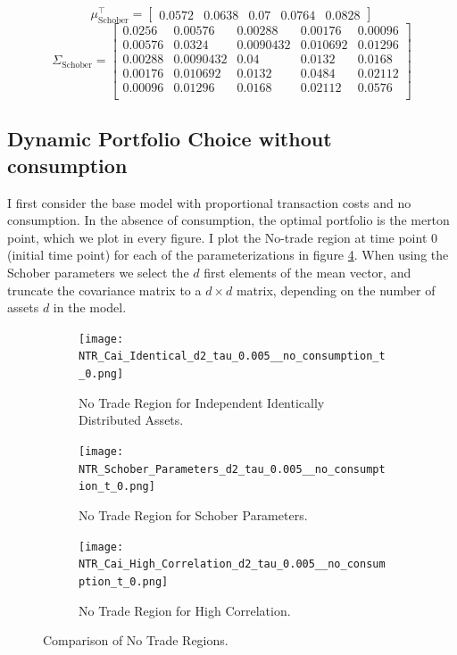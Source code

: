 \documentclass[11pt]{article}
\begin{document}
\[
\mu_{\text{Schober}}^\top = 
\begin{bmatrix}
0.0572 & 0.0638 & 0.07 & 0.0764 & 0.0828
\end{bmatrix}
\]
\[
\Sigma_{\text{Schober}} = 
\begin{bmatrix}
0.0256 & 0.00576 & 0.00288 & 0.00176 & 0.00096 \\
0.00576 & 0.0324 & 0.0090432 & 0.010692 & 0.01296 \\
0.00288 & 0.0090432 & 0.04 & 0.0132 & 0.0168 \\
0.00176 & 0.010692 & 0.0132 & 0.0484 & 0.02112 \\
0.00096 & 0.01296 & 0.0168 & 0.02112 & 0.0576 \\
\end{bmatrix}
\]
\subsection{Dynamic Portfolio Choice without consumption} \label{Subsection: Results_NoConsumption}
I first consider the base model with proportional transaction costs
and no consumption. In the absence of consumption, the optimal portfolio is the merton point, which we plot in every figure.
I plot the No-trade region at time point 0 (initial time point) for each of the parameterizations in figure \ref{fig:comparison_NTR}.
When using the Schober parameters we select the $d$ first elements of the mean vector, and truncate the covariance matrix to a $d \times d$ matrix,
depending on the number of assets $d$ in the model.
\begin{figure}[!ht]
    \centering
    \begin{subfigure}[t]{\textwidth}
        \centering
        \texttt{[image: NTR\_Cai\_Identical\_d2\_tau\_0.005\_\_no\_consumption\_t\_0.png]}
        \caption{No Trade Region for Independent Identically Distributed Assets.}
        \label{fig:NTR_2d_iid}
    \end{subfigure}

    \vspace{1em}

    \begin{subfigure}[t]{0.48\textwidth}
        \centering
        \texttt{[image: NTR\_Schober\_Parameters\_d2\_tau\_0.005\_\_no\_consumption\_t\_0.png]}
        \caption{No Trade Region for Schober Parameters.}
        \label{fig:NTR_2d_Schober}
    \end{subfigure}%
    \hfill
    \begin{subfigure}[t]{0.48\textwidth}
        \centering
        \texttt{[image: NTR\_Cai\_High\_Correlation\_d2\_tau\_0.005\_\_no\_consumption\_t\_0.png]}
        \caption{No Trade Region for High Correlation.}
        \label{fig:NTR_2d_High_Correlation}
    \end{subfigure}

    \caption{Comparison of No Trade Regions.}
    \label{fig:comparison_NTR}
\end{figure}
\end{document}
